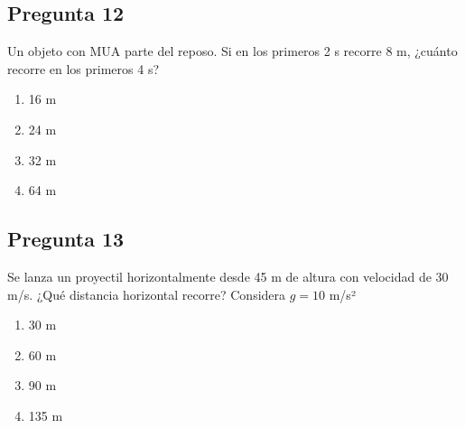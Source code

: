 \begin{preguntabox}
\subsection{Pregunta 12}
Un objeto con MUA parte del reposo. Si en los primeros 2 s recorre 8 m, ¿cuánto recorre en los primeros 4 s?

\begin{enumerate}
    \item[A)] 16 m
    \item[B)] 24 m
    \item[C)] 32 m
    \item[D)] 64 m
\end{enumerate}
\end{preguntabox}

\begin{preguntabox}
\subsection{Pregunta 13}
Se lanza un proyectil horizontalmente desde 45 m de altura con velocidad de 30 m/s. ¿Qué distancia horizontal recorre? Considera $g = 10$ m/s²

\begin{enumerate}
    \item[A)] 30 m
    \item[B)] 60 m
    \item[C)] 90 m
    \item[D)] 135 m
\end{enumerate}
\end{preguntabox}

